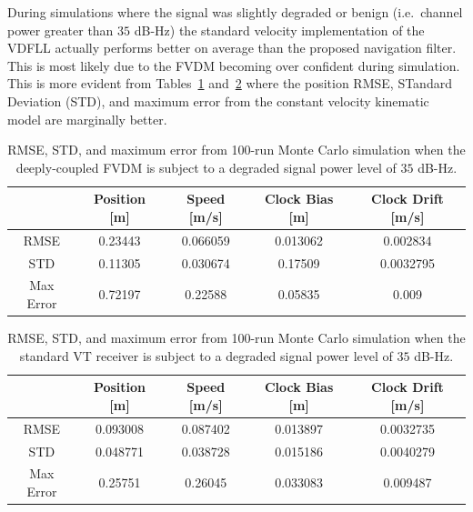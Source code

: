 During simulations where the signal was slightly degraded or benign (i.e.\ channel power greater than \(35\) dB-Hz) the standard velocity implementation of the VDFLL actually performs better on average than the proposed navigation filter. This is most likely due to the FVDM becoming over confident during simulation. This is more evident from Tables~\ref{tbl:straight35FVDM} and~\ref{tbl:straight35CV} where the position RMSE, STandard Deviation (STD), and maximum error from the constant velocity kinematic model are marginally better.

\begin{table}[!ht]
    \caption{RMSE, STD, and maximum error from 100-run Monte Carlo simulation when the deeply-coupled FVDM is subject to a degraded signal power level of \(35\) dB-Hz.}\label{tbl:straight35FVDM}
    \centering
    \begin{tabular}{ccccc}
        \toprule
                  & Position [m] & Speed [m/s] & Clock Bias [m] & Clock Drift [m/s] \\
        \midrule
        RMSE      & 0.23443      & 0.066059    & 0.013062       & 0.002834          \\
        STD       & 0.11305      & 0.030674    & 0.17509        & 0.0032795         \\
        Max Error & 0.72197      & 0.22588     & 0.05835        & 0.009             \\
        \bottomrule
    \end{tabular}
\end{table}

\begin{table}[!ht]
    \caption{RMSE, STD, and maximum error from 100-run Monte Carlo simulation when the standard VT receiver is subject to a degraded signal power level of \(35\) dB-Hz.}\label{tbl:straight35CV}
    \centering
    \begin{tabular}{ccccc}
        \toprule
                  & Position [m] & Speed [m/s] & Clock Bias [m] & Clock Drift [m/s] \\
        \midrule
        RMSE      & 0.093008     & 0.087402    & 0.013897       & 0.0032735         \\
        STD       & 0.048771     & 0.038728    & 0.015186       & 0.0040279         \\
        Max Error & 0.25751      & 0.26045     & 0.033083       & 0.009487          \\
        \bottomrule
    \end{tabular}
\end{table}

